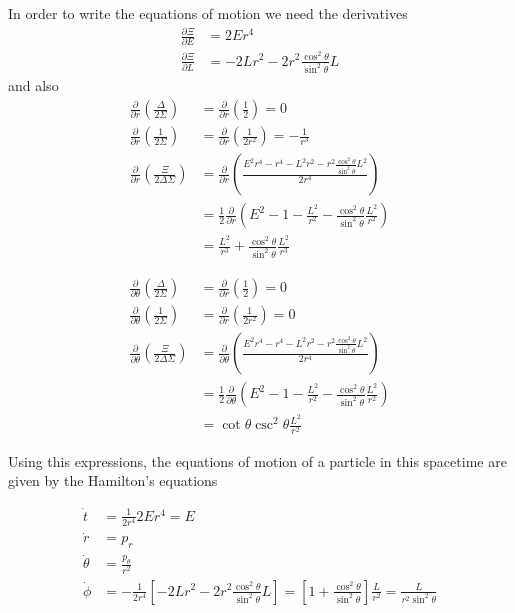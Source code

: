 In order to write the equations of motion we need the derivatives
\begin{align}
\frac{\partial \Xi}{\partial E} &= 2E r^4 \\
\frac{\partial \Xi}{\partial L} &= - 2 L r^2 -2 r^2 \frac{\cos^2 \theta}{\sin^2 \theta}L
\end{align}
and also
\begin{align}
\frac{\partial}{\partial r}\left( \frac{\Delta}{2\Sigma}\right) &= \frac{\partial}{\partial r}\left( \frac{1}{2}\right) = 0 \\
\frac{\partial}{\partial r}\left( \frac{1}{2\Sigma}\right) &= \frac{\partial}{\partial r}\left( \frac{1}{2r^2}\right) = -\frac{1}{r^3}\\
\frac{\partial}{\partial r}\left( \frac{\Xi}{2\Delta \Sigma}\right) &= \frac{\partial}{\partial r}\left( \frac{E^2 r^4 -  r^4 -  L^2 r^2  - r^2 \frac{\cos^2 \theta}{\sin^2 \theta} L^2}{2r^4}\right) \nonumber \\
&= \frac{1}{2} \frac{\partial}{\partial r}\left( E^2 - 1 - \frac{L^2}{r^2} - \frac{\cos^2 \theta}{\sin^2 \theta} \frac{L^2}{r^2} \right) \nonumber \\
&= \frac{L^2}{r^3} + \frac{\cos^2 \theta}{\sin^2 \theta} \frac{L^2}{r^3} 
\end{align}

\begin{align}
\frac{\partial}{\partial \theta}\left( \frac{\Delta}{2\Sigma}\right) &= \frac{\partial}{\partial r}\left( \frac{1}{2}\right) = 0 \\
\frac{\partial}{\partial \theta}\left( \frac{1}{2\Sigma}\right) &= \frac{\partial}{\partial r}\left( \frac{1}{2r^2}\right) = 0\\
\frac{\partial}{\partial \theta}\left( \frac{\Xi}{2\Delta \Sigma}\right) &= \frac{\partial}{\partial \theta}\left( \frac{E^2 r^4 -  r^4 -  L^2 r^2  - r^2 \frac{\cos^2 \theta}{\sin^2 \theta} L^2}{2r^4}\right) \nonumber \\
&= \frac{1}{2} \frac{\partial}{\partial \theta}\left( E^2 - 1 - \frac{L^2}{r^2} - \frac{\cos^2 \theta}{\sin^2 \theta} \frac{L^2}{r^2} \right) \nonumber \\
&= \cot \theta \csc^2 \theta \frac{L^2}{r^2} 
\end{align}

Using this expressions, the equations of motion of a particle in this spacetime are given by the Hamilton's equations

\begin{align*}
	\dot{t} &= \frac{1}{2r^4} 2E r^4 = E\\
	\dot{r} &= p_r \\
	\dot{\theta} &= \frac{p_\theta}{r^2}\\
	\dot{\phi} &= - \frac{1}{2r^4} \left[ - 2 L r^2 -2 r^2 \frac{\cos^2 \theta}{\sin^2 \theta}L \right] = \left[ 1 + \frac{\cos^2 \theta}{\sin^2 \theta} \right] \frac{L}{r^2} = \frac{L}{r^2 \sin^2 \theta}\\	
\end{align*}


